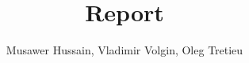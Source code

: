 \documentclass{article}
\begin{document}
\title{Report}

\author{Musawer Hussain, Vladimir Volgin, Oleg Tretieu}

\maketitle

\

\begin{figure}[h]
  \caption{}
\end{figure}
\end{document}
